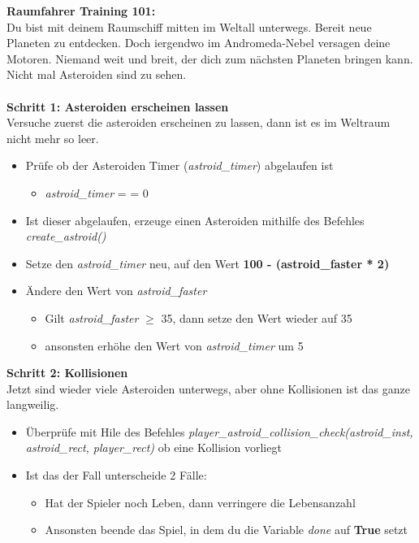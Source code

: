 \textbf{\large Raumfahrer Training 101:}\\
Du bist mit deinem Raumschiff mitten im Weltall unterwegs. Bereit neue Planeten zu entdecken. Doch iergendwo im Andromeda-Nebel versagen deine Motoren. Niemand weit und breit, der dich zum nächsten Planeten bringen kann. Nicht mal Asteroiden sind zu sehen.\\\\
\textbf{Schritt 1: Asteroiden erscheinen lassen}\\
Versuche zuerst die asteroiden erscheinen zu lassen, dann ist es im Weltraum nicht mehr so leer.
\begin{itemize}
	\item Prüfe ob der Asteroiden Timer (\textit{astroid\_timer}) abgelaufen ist
	\begin{itemize}
		\item \textit{astroid\_timer} = = 0
	\end{itemize}
	\item Ist dieser abgelaufen, erzeuge einen Asteroiden mithilfe des Befehles \textit{create\_astroid()}
	\item Setze den \textit{astroid\_timer} neu, auf den Wert \textbf{100 - (astroid\_faster * 2)}
	\item Ändere den Wert von \textit{astroid\_faster}
	\begin{itemize}
		\item Gilt \textit{astroid\_faster} $\geq$ 35, dann setze den Wert wieder auf 35
		\item ansonsten erhöhe den Wert von \textit{astroid\_timer} um 5
	\end{itemize}
\end{itemize}
\textbf{Schritt 2: Kollisionen}\\
Jetzt sind wieder viele Asteroiden unterwegs, aber ohne Kollisionen ist das ganze langweilig.
\begin{itemize}
	\item Überprüfe mit Hile des Befehles \textit{player\_astroid\_collision\_check(astroid\_inst, astroid\_rect, player\_rect)} ob eine Kollision vorliegt
	\item Ist das der Fall unterscheide 2 Fälle:
	\begin{itemize}
		\item Hat der Spieler noch Leben, dann verringere die Lebensanzahl
		\item Ansonsten beende das Spiel, in dem du die Variable \textit{done} auf \textbf{True} setzt
	\end{itemize}
\end{itemize}
